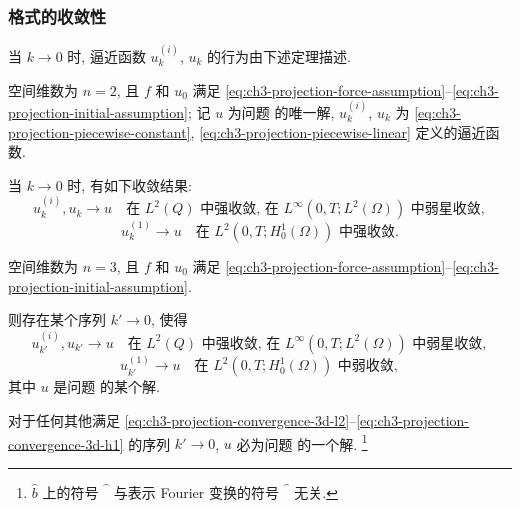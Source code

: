\subsubsection{格式的收敛性}
\label{subsubsec:ch3-projection-two-step-convergence}

当 $k\to0$ 时, 逼近函数 $u_k^{(i)}$, $u_k$ 的行为由下述定理描述.

\begin{Theorem}
\label{thm:ch3-projection-convergence-two-dimensional}
空间维数为 $n=2$, 且 $f$ 和 $u_0$ 满足 \eqref{eq:ch3-projection-force-assumption}--\eqref{eq:ch3-projection-initial-assumption}; 记 $u$ 为问题  的唯一解, $u_k^{(i)}$, $u_k$ 为 \eqref{eq:ch3-projection-piecewise-constant}, \eqref{eq:ch3-projection-piecewise-linear} 定义的逼近函数.

当 $k\to0$ 时, 有如下收敛结果:
\begin{equation}
u_k^{(i)},u_k\longrightarrow u
\quad\text{在 }L^2(Q)\text{ 中强收敛, 在 }L^\infty(0,T;L^2(\Omega))
\text{ 中弱星收敛},
\label{eq:ch3-projection-convergence-2d-l2}
\end{equation}
\begin{equation}
u_k^{(1)}\longrightarrow u
\quad\text{在 }L^2(0,T;H_0^1(\Omega))\text{ 中强收敛}.
\label{eq:ch3-projection-convergence-2d-h1}
\end{equation}
\end{Theorem}

\begin{Theorem}
\label{thm:ch3-projection-convergence-three-dimensional}
空间维数为 $n=3$, 且 $f$ 和 $u_0$ 满足 \eqref{eq:ch3-projection-force-assumption}--\eqref{eq:ch3-projection-initial-assumption}.

则存在某个序列 $k'\to0$, 使得
\begin{equation}
u_{k'}^{(i)},u_{k'}\longrightarrow u
\quad\text{在 }L^2(Q)\text{ 中强收敛, 在 }L^\infty(0,T;L^2(\Omega))
\text{ 中弱星收敛},
\label{eq:ch3-projection-convergence-3d-l2}
\end{equation}
\begin{equation}
u_{k'}^{(1)}\longrightarrow u
\quad\text{在 }L^2(0,T;H_0^1(\Omega))\text{ 中弱收敛},
\label{eq:ch3-projection-convergence-3d-h1}
\end{equation}
其中 $u$ 是问题  的某个解.

对于任何其他满足 \eqref{eq:ch3-projection-convergence-3d-l2}--\eqref{eq:ch3-projection-convergence-3d-h1} 的序列 $k'\to0$, $u$ 必为问题  的一个解.
\footnote{$\widehat b$ 上的符号 $\widehat{\phantom b}$ 与表示 Fourier 变换的符号 $\widehat{\phantom b}$ 无关.}
\end{Theorem}

